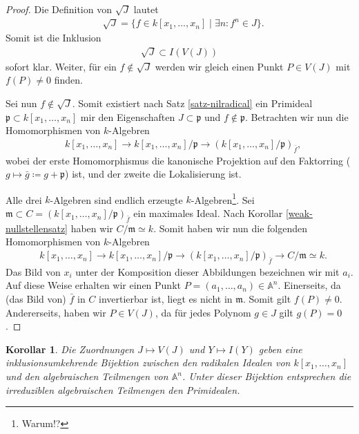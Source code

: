 \documentclass[reqno,12pt]{article}
\numberwithin{equation}{section}
\newcommand{\bA}{\mathbb{A}}
\newcommand{\iso}{\simeq}
\theoremstyle{plain}
\newtheorem{cor}[thm]{Korollar}
\theoremstyle{definition}
\begin{document}
\begin{proof}
Die Definition von $\sqrt{J}$ lautet
\begin{align*}
& \sqrt{J} = \{f \in k[x_1, \dots, x_n] \mid \exists n \colon f^n \in J\}.
\end{align*}
Somit ist die Inklusion
\begin{align*}
\sqrt{J} \subset I(V(J))
\end{align*}
sofort klar. Weiter, für ein $f \notin \sqrt{J}$ werden wir gleich einen Punkt $P \in V(J)$ mit $f(P) \neq 0$ finden.

Sei nun $f \notin \sqrt{J}$. Somit existiert nach Satz \ref{satz-nilradical} ein Primideal $\mathfrak{p} \subset k[x_1, \dots, x_n]$ mir den Eigenschaften $J \subset \mathfrak{p}$ und $f \notin \mathfrak{p}$. Betrachten wir nun die Homomorphismen von $k$-Algebren
\begin{align*}
&  k[x_1, \dots, x_n] \to k[x_1, \dots, x_n]/\mathfrak{p} \to  (k[x_1, \dots, x_n]/\mathfrak{p})_{\bar{f}},
\end{align*}
wobei der erste Homomorphismus die kanonische Projektion auf den Faktorring ($g \mapsto \bar{g} \coloneqq g + \mathfrak{p}$) ist, und der zweite die Lokalisierung ist.

Alle drei $k$-Algebren sind endlich erzeugte $k$-Algebren\footnote{Warum!?}. Sei $\mathfrak{m} \subset C = (k[x_1, \dots, x_n]/\mathfrak{p})_{\bar{f}}$ ein maximales Ideal. Nach Korollar \ref{weak-nullstellensatz} haben wir $C/\mathfrak{m} \iso k$. Somit haben wir nun die folgenden Homomorphismen von $k$-Algebren
\begin{align*}
&  k[x_1, \dots, x_n] \to k[x_1, \dots, x_n]/\mathfrak{p} \to  (k[x_1, \dots, x_n]/\mathfrak{p})_{\bar{f}} \to C/\mathfrak{m} \iso k.
\end{align*}
Das Bild von $x_i$ unter der Komposition dieser Abbildungen bezeichnen wir mit $a_i$. Auf diese Weise erhalten wir einen Punkt $P=(a_1, \dots, a_n) \in \bA^n$. Einerseits, da (das Bild von) $\bar{f}$ in $C$ invertierbar ist, liegt es nicht in $\mathfrak{m}$. Somit gilt $f(P) \neq 0$. Andererseits, haben wir $P \in V(J)$, da für jedes Polynom $g \in J$ gilt $g(P)=0$.
\end{proof}

\begin{cor}
Die Zuordnungen $J \mapsto V(J)$ und $Y \mapsto I(Y)$ geben eine inklusionsumkehrende Bijektion zwischen den radikalen Idealen von $k[x_1, \dots, x_n]$ und den algebraischen Teilmengen von $\bA^n$. Unter dieser Bijektion entsprechen die irreduziblen algebraischen Teilmengen den Primidealen.
\end{cor}
\end{document}
